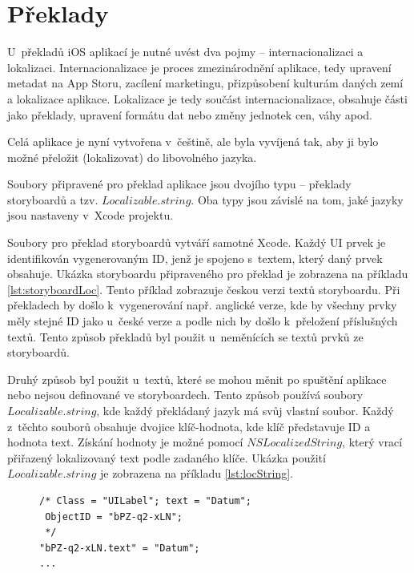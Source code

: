 \documentclass[thesis=M,czech]{FITthesis}[2012/06/26]
\begin{document}
\section{Překlady}
U~překladů iOS aplikací je nutné uvést dva pojmy -- internacionalizaci a lokalizaci. Internacionalizace je proces zmezinárodnění aplikace, tedy upravení metadat na App Storu, zacílení marketingu, přizpůsobení kulturám daných zemí a lokalizace aplikace. Lokalizace je tedy součást internacionalizace, obsahuje části jako překlady, upravení formátu dat nebo změny jednotek cen, váhy apod. \cite{internationalization}

Celá aplikace je nyní vytvořena v~češtině, ale byla vyvíjená tak, aby ji bylo možné přeložit (lokalizovat) do libovolného jazyka.

Soubory připravené pro překlad aplikace jsou dvojího typu -- překlady storyboardů a tzv. $Localizable.string$. Oba typy jsou závislé na tom, jaké jazyky jsou nastaveny v~Xcode projektu.

Soubory pro překlad storyboardů vytváří samotné Xcode. Každý UI prvek je identifikován vygenerovaným ID, jenž je spojeno s~textem, který daný prvek obsahuje. Ukázka storyboardu připraveného pro překlad je zobrazena na příkladu \ref{lst:storyboardLoc}. Tento příklad zobrazuje českou verzi textů storyboardu. Při překladech by došlo k~vygenerování např. anglické verze, kde by všechny prvky měly stejné ID jako u~české verze a podle nich by došlo k~přeložení příslušných textů. Tento způsob překladů byl použit u~neměnících se textů prvků ze storyboardů.

Druhý způsob byl použit u~textů, které se mohou měnit po spuštění aplikace nebo nejsou definované ve storyboardech. Tento způsob používá soubory $Localizable.string$, kde každý překládaný jazyk má svůj vlastní soubor. Každý z~těchto souborů obsahuje dvojice klíč-hodnota, kde klíč představuje ID a hodnota text. Získání hodnoty je možné pomocí $NSLocalizedString$, který vrací přiřazený lokalizovaný text podle zadaného klíče. Ukázka použití $Localizable.string$ je zobrazena na příkladu \ref{lst:locString}.

\begin{figure}
\begin{minipage}{\linewidth}
\begin{lstlisting}[caption={Ukázka přípravy storyboardu pro překlad},label={lst:storyboardLoc}]
/* Class = "UILabel"; text = "Datum";
 ObjectID = "bPZ-q2-xLN";
 */
"bPZ-q2-xLN.text" = "Datum";
...
\end{lstlisting}
\end{minipage}
\end{figure}
\end{document}
